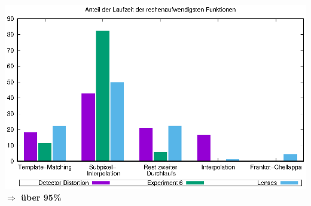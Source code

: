 \begin{frame}[allowframebreaks]
\begin{center}
\framebreak
		
		\includegraphics[width=0.94\linewidth]{img/slow.eps}\\
		\textbf{$ \Rightarrow $ über 95\%}
	\end{center}
\end{frame}